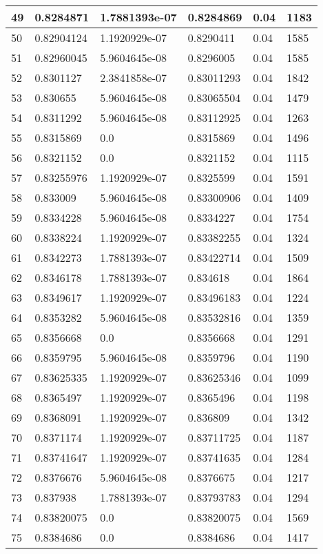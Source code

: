 \begin{longtable}{|l|l|l|l|l|l|}
49 & 0.8284871 & 1.7881393e-07 & 0.8284869 & 0.04 & 1183 \\ \hline 
50 & 0.82904124 & 1.1920929e-07 & 0.8290411 & 0.04 & 1585 \\ \hline 
51 & 0.82960045 & 5.9604645e-08 & 0.8296005 & 0.04 & 1585 \\ \hline 
52 & 0.8301127 & 2.3841858e-07 & 0.83011293 & 0.04 & 1842 \\ \hline 
53 & 0.830655 & 5.9604645e-08 & 0.83065504 & 0.04 & 1479 \\ \hline 
54 & 0.8311292 & 5.9604645e-08 & 0.83112925 & 0.04 & 1263 \\ \hline 
55 & 0.8315869 & 0.0 & 0.8315869 & 0.04 & 1496 \\ \hline 
56 & 0.8321152 & 0.0 & 0.8321152 & 0.04 & 1115 \\ \hline 
57 & 0.83255976 & 1.1920929e-07 & 0.8325599 & 0.04 & 1591 \\ \hline 
58 & 0.833009 & 5.9604645e-08 & 0.83300906 & 0.04 & 1409 \\ \hline 
59 & 0.8334228 & 5.9604645e-08 & 0.8334227 & 0.04 & 1754 \\ \hline 
60 & 0.8338224 & 1.1920929e-07 & 0.83382255 & 0.04 & 1324 \\ \hline 
61 & 0.8342273 & 1.7881393e-07 & 0.83422714 & 0.04 & 1509 \\ \hline 
62 & 0.8346178 & 1.7881393e-07 & 0.834618 & 0.04 & 1864 \\ \hline 
63 & 0.8349617 & 1.1920929e-07 & 0.83496183 & 0.04 & 1224 \\ \hline 
64 & 0.8353282 & 5.9604645e-08 & 0.83532816 & 0.04 & 1359 \\ \hline 
65 & 0.8356668 & 0.0 & 0.8356668 & 0.04 & 1291 \\ \hline 
66 & 0.8359795 & 5.9604645e-08 & 0.8359796 & 0.04 & 1190 \\ \hline 
67 & 0.83625335 & 1.1920929e-07 & 0.83625346 & 0.04 & 1099 \\ \hline 
68 & 0.8365497 & 1.1920929e-07 & 0.8365496 & 0.04 & 1198 \\ \hline 
69 & 0.8368091 & 1.1920929e-07 & 0.836809 & 0.04 & 1342 \\ \hline 
70 & 0.8371174 & 1.1920929e-07 & 0.83711725 & 0.04 & 1187 \\ \hline 
71 & 0.83741647 & 1.1920929e-07 & 0.83741635 & 0.04 & 1284 \\ \hline 
72 & 0.8376676 & 5.9604645e-08 & 0.8376675 & 0.04 & 1217 \\ \hline 
73 & 0.837938 & 1.7881393e-07 & 0.83793783 & 0.04 & 1294 \\ \hline 
74 & 0.83820075 & 0.0 & 0.83820075 & 0.04 & 1569 \\ \hline 
75 & 0.8384686 & 0.0 & 0.8384686 & 0.04 & 1417 \\ \hline 
\end{longtable}